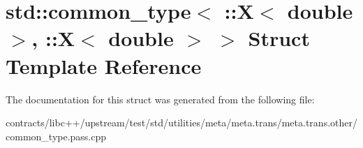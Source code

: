 \hypertarget{structstd_1_1common__type_3_01_1_1_x_3_01double_01_4_00_01_1_1_x_3_01double_01_4_01_4}{}\section{std\+:\+:common\+\_\+type$<$ \+:\+:X$<$ double $>$, \+:\+:X$<$ double $>$ $>$ Struct Template Reference}
\label{structstd_1_1common__type_3_01_1_1_x_3_01double_01_4_00_01_1_1_x_3_01double_01_4_01_4}


The documentation for this struct was generated from the following file\+:\begin{DoxyCompactItemize}
\item 
contracts/libc++/upstream/test/std/utilities/meta/meta.\+trans/meta.\+trans.\+other/common\+\_\+type.\+pass.\+cpp\end{DoxyCompactItemize}
